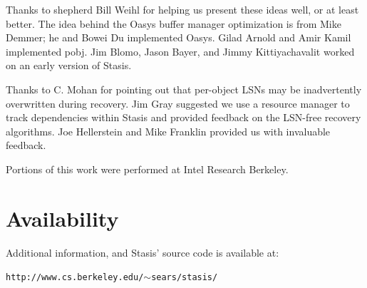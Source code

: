 \documentclass[letterpaper,twocolumn,10pt]{article}
\newcommand{\yad}{Stasis\xspace}
\newcommand{\yads}{Stasis'\xspace}
\newcommand{\oasys}{Oasys\xspace}
\begin{document}
Thanks to shepherd Bill Weihl for helping us present these ideas well,
or at least better. The idea behind the \oasys buffer manager
optimization is from Mike Demmer; he and Bowei Du implemented \oasys.
Gilad Arnold and Amir Kamil implemented
 pobj.  Jim Blomo, Jason Bayer, and Jimmy
Kittiyachavalit worked on an early version of \yad.

Thanks to C. Mohan for pointing out that per-object LSNs may be
inadvertently overwritten during recovery.  Jim Gray suggested we use
a resource manager to track dependencies within \yad and provided
feedback on the LSN-free recovery algorithms.  Joe Hellerstein and
Mike Franklin provided us with invaluable feedback.

Portions of this work were performed at Intel Research Berkeley.

\section{Availability}
\label{sec:avail}

Additional information, and \yads source code is available at:

\begin{center}
{\small{\tt http://www.cs.berkeley.edu/\ensuremath{\sim}sears/stasis/}}
\end{center}

{\footnotesize 

}

\theendnotes
\end{document}
